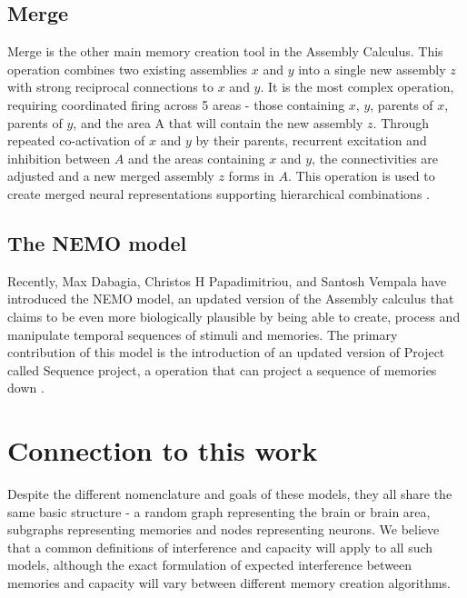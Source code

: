 \subsection{Merge}

Merge is the other main memory creation tool in the Assembly Calculus. This operation combines two existing assemblies $x$ and $y$ into a single new assembly $z$ with strong reciprocal connections to $x$ and $y$. It is the most complex operation, requiring coordinated firing across 5 areas - those containing $x$, $y$, parents of $x$, parents of $y$, and the area A that will contain the new assembly $z$. Through repeated co-activation of $x$ and $y$ by their parents, recurrent excitation and inhibition between $A$ and the areas containing $x$ and $y$, the connectivities are adjusted and a new merged assembly $z$ forms in $A$. This operation is used to create merged neural representations supporting hierarchical combinations \cite{papadimitriou2020brain}.

\subsection{The NEMO model}

Recently, Max Dabagia, Christos H Papadimitriou, and Santosh Vempala have introduced the NEMO model, an updated version of the Assembly calculus that claims to be even more biologically plausible by being able to create, process and manipulate temporal sequences of stimuli and memories. The primary contribution of this model is the introduction of an updated version of Project called Sequence project, a operation that can project a sequence of memories down \cite{dabagia2023computation}.  

\section{Connection to this work}

Despite the different nomenclature and goals of these models, they all share the same basic structure - a random graph representing the brain or brain area, subgraphs representing memories and nodes representing neurons. We believe that a common definitions of interference and capacity will apply to all such models, although the exact formulation of expected interference between memories and capacity will vary between different memory creation algorithms. 

